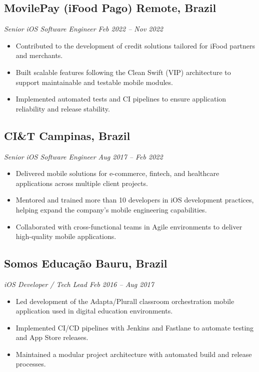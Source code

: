 \documentclass[a4paper,10pt]{article}
\begin{document}
\subsection*{\textbf{MovilePay (iFood Pago)} \hfill Remote, Brazil}
\textit{Senior iOS Software Engineer \hfill Feb 2022 – Nov 2022}

\begin{itemize}

\item Contributed to the development of credit solutions tailored for iFood partners and merchants.

\item Built scalable features following the Clean Swift (VIP) architecture to support maintainable and testable mobile modules.

\item Implemented automated tests and CI pipelines to ensure application reliability and release stability.

\end{itemize}

\subsection*{\textbf{CI\&T} \hfill Campinas, Brazil}
\textit{Senior iOS Software Engineer \hfill Aug 2017 – Feb 2022}

\begin{itemize}

\item Delivered mobile solutions for e-commerce, fintech, and healthcare applications across multiple client projects.

\item Mentored and trained more than 10 developers in iOS development practices, helping expand the company’s mobile engineering capabilities.

\item Collaborated with cross-functional teams in Agile environments to deliver high-quality mobile applications.

\end{itemize}

\subsection*{\textbf{Somos Educação} \hfill Bauru, Brazil}
\textit{iOS Developer / Tech Lead \hfill Feb 2016 – Aug 2017}

\begin{itemize}

\item Led development of the Adapta/Plurall classroom orchestration mobile application used in digital education environments.

\item Implemented CI/CD pipelines with Jenkins and Fastlane to automate testing and App Store releases.

\item Maintained a modular project architecture with automated build and release processes.

\end{itemize}
\end{document}
